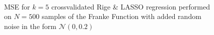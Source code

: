 \documentclass[reprint, english, nofootinbib]{revtex4-2}
\begin{document}
\begin{figure}
{         }
         \\
         \caption{MSE for $k=5$ crossvalidated Rige \& LASSO regression performed on $N=500$ samples of the Franke Function with added random noise in the form $\mathcal N(0, 0.2)$}
         \label{contour plots}
    \end{figure}
\end{document}

